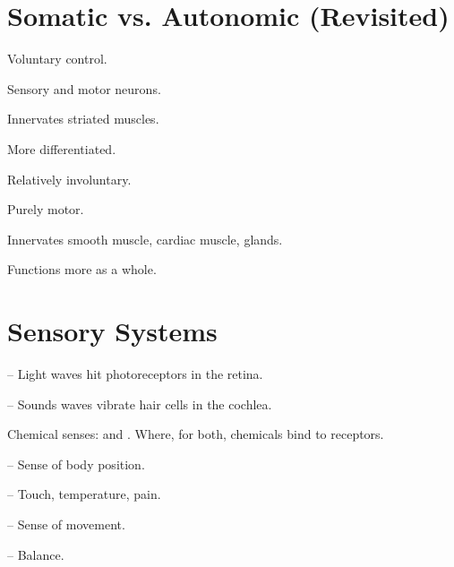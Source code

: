 \section{Somatic vs. Autonomic (Revisited)}

\begin{coloredlist}
    \item {} 
    \begin{coloredlist}
        \item Voluntary control.
        \item Sensory and motor neurons.
        \item Innervates striated muscles.
        \item More differentiated.
    \end{coloredlist}
    \item {}
    \begin{coloredlist}
        \item Relatively involuntary.
        \item Purely motor.
        \item Innervates smooth muscle, cardiac muscle, glands.
        \item Functions more as a whole.
    \end{coloredlist}
\end{coloredlist}

\section{Sensory Systems}

\begin{coloredlist}
    \item {} -- Light waves hit photoreceptors in the retina.
    \item {} -- Sounds waves vibrate hair cells in the cochlea.
    \item Chemical senses:  and . Where, for both, chemicals bind to receptors.
    \item {} 
    \begin{coloredlist}
        \item {} -- Sense of body position.
        \item {} -- Touch, temperature, pain.
        \item {} -- Sense of movement.
        \item {} -- Balance.
    \end{coloredlist}
\end{coloredlist}

